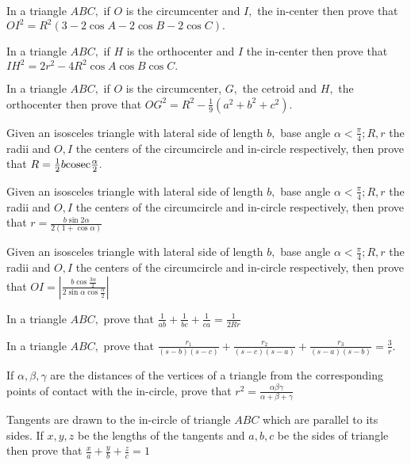 \item In a triangle $ABC,$ if $O$ is the circumcenter and $I,$ the in-center then prove that $OI^2 = R^2(3 -
   2\cos A - 2\cos B - 2\cos C).$

\item In a triangle $ABC,$ if $H$ is the orthocenter and $I$ the in-center then prove that $IH^2 = 2r^2 -
   4R^2\cos A\cos B\cos C.$

\item In a triangle $ABC,$ if $O$ is the circumcenter, $G,$ the cetroid and $H,$ the orthocenter then prove
   that $OG^2 = R^2 - \frac{1}{9}(a^2 + b^2 + c^2).$

\item Given an isosceles triangle with lateral side of length $b,$ base angle $\alpha < \frac{\pi}{4};R, r$ the radii and
   $O, I$ the centers of the circumcircle and in-circle respectively, then prove that $R =
   \frac{1}{2}b{\rm cosec}\frac{\alpha}{2}.$

\item Given an isosceles triangle with lateral side of length $b,$ base angle $\alpha < \frac{\pi}{4};R, r$ the radii and
   $O, I$ the centers of the circumcircle and in-circle respectively, then prove that $r = \frac{b\sin2\alpha}{2(1 +
   \cos\alpha)}$

\item Given an isosceles triangle with lateral side of length $b,$ base angle $\alpha < \frac{\pi}{4};R, r$ the radii and
   $O, I$ the centers of the circumcircle and in-circle respectively, then prove that $OI =
   \left|\frac{b\cos\frac{3\alpha}{2}}{2\sin \alpha\cos\frac{\alpha}{2}}\right|$

\item In a triangle $ABC,$ prove that $\frac{1}{ab} + \frac{1}{bc} + \frac{1}{ca} = \frac{1}{2Rr}$

\item In a triangle $ABC,$ prove that $\frac{r_1}{(s - b)(s - c)} + \frac{r_2}{(s - c)(s - a)} + \frac{r_3}{(s - a)(s -
   b)} = \frac{3}{r}.$

\item If $\alpha, \beta, \gamma$ are the distances of the vertices of a triangle from the corresponding points of contact with
   the in-circle, prove that $r^2 = \frac{\alpha\beta\gamma}{\alpha + \beta + \gamma}$

\item Tangents are drawn to the in-circle of triangle $ABC$ which are parallel to its sides. If $x, y, z$ be the lengths
   of the tangents and $a, b, c$ be the sides of triangle then prove that $\frac{x}{a} + \frac{y}{b} + \frac{z}{c} = 1$

